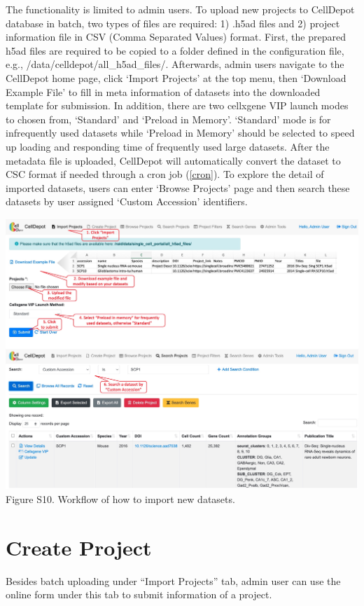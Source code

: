 \documentclass[runningheads]{llncs}
\begin{document}
The functionality is limited to admin users. To upload new projects to CellDepot database in batch, two types of files are required: 1) .h5ad files and 2) project information file in CSV (Comma Separated Values) format. First, the prepared h5ad files are required to be copied to a folder defined in the configuration file, e.g., /data/celldepot/all\_h5ad\_files/. Afterwards, admin users navigate to the CellDepot home page, click `Import Projects' at the top menu, then `Download Example File' to fill in meta information of datasets into the downloaded template for submission. In addition, there are two cellxgene VIP launch modes to chosen from, `Standard' and `Preload in Memory'. `Standard' mode is for infrequently used datasets while `Preload in Memory' should be selected to speed up loading and responding time of frequently used large datasets.
After the metadata file is uploaded, CellDepot will automatically convert the dataset to CSC format if needed through a cron job (\ref{cron}). To explore the detail of imported datasets, users can enter `Browse Projects' page and then search these datasets by user assigned `Custom Accession' identifiers.

\href{figures/S10.jpg}{\includegraphics{figures/S10.jpg}}
Figure S10. Workflow of how to import new datasets.

\hypertarget{create-project}{%
\section{Create Project}\label{create-project}}

Besides batch uploading under ``Import Projects'' tab, admin user can use the online form under this tab to submit information of a project.
\end{document}
